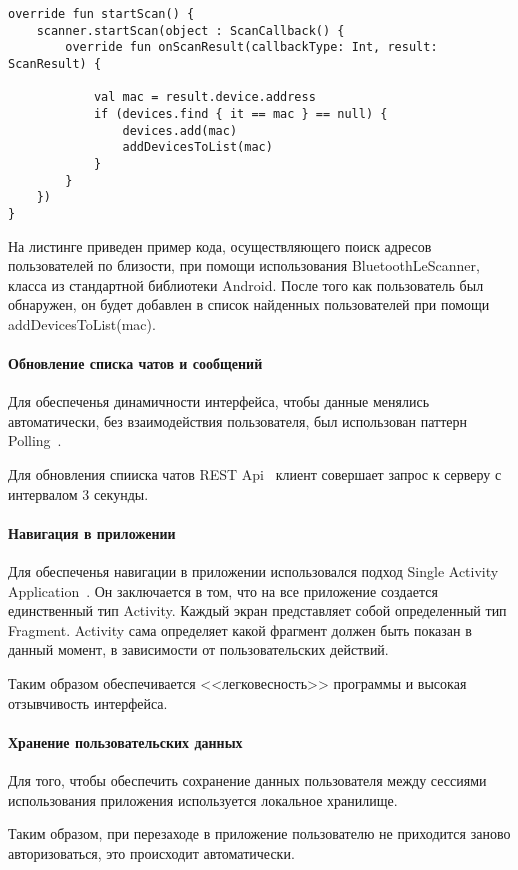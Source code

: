 \documentclass[explnote]{espd}
\begin{document}
\begin{verbatim}
override fun startScan() {
    scanner.startScan(object : ScanCallback() {
        override fun onScanResult(callbackType: Int, result: ScanResult) {

            val mac = result.device.address
            if (devices.find { it == mac } == null) {
                devices.add(mac)
                addDevicesToList(mac)
            }
        }
    })
}
\end{verbatim}

На листинге приведен пример кода, осуществляющего поиск адресов пользователей по близости, при помощи использования BluetoothLeScanner, класса из стандартной библиотеки Android. После того как пользователь был обнаружен, он будет добавлен в список найденных пользователей при помощи addDevicesToList(mac).

\paragraph{Обновление списка чатов и сообщений}
Для обеспеченья динамичности интерфейса, чтобы данные менялись автоматически, без взаимодействия пользователя, был использован паттерн Polling~\cite{polling}.

Для обновления спииска чатов REST Api~\cite{rest} клиент совершает запрос к серверу с интервалом 3 секунды.

\paragraph{Навигация в приложении}
Для обеспеченья навигации в приложении использовался подход Single Activity Application~\cite{SAA}. Он заключается в том, что на все приложение создается единственный тип Activity. Каждый экран представляет собой определенный тип Fragment. Activity сама определяет какой фрагмент должен быть показан в данный момент, в зависимости от пользовательских действий. 

Таким образом обеспечивается <<легковесность>> программы и высокая отзывчивость интерфейса.

\paragraph{Хранение пользовательских данных}
Для того, чтобы обеспечить сохранение данных пользователя между сессиями использования приложения используется локальное хранилище.

Таким образом, при перезаходе в приложение пользователю не приходится заново авторизоваться, это происходит автоматически. 
\end{document}
